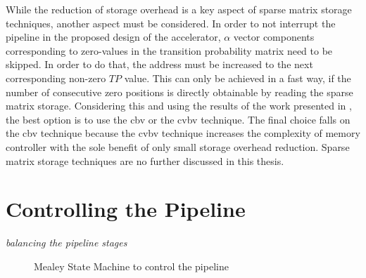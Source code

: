 \documentclass[mscthesis]{usiinfthesis}
\begin{document}
While the reduction of storage overhead is a key aspect of sparse matrix
storage techniques, another aspect must be considered. In order to not
interrupt the pipeline in the proposed design of the accelerator, $\alpha$
vector components corresponding to zero-values in the transition probability
matrix need to be skipped. In order to do that, the address must be increased
to the next corresponding non-zero $TP$ value. This can only be achieved in a
fast way, if the number of consecutive zero positions is directly obtainable
by reading the sparse matrix storage. Considering this and using the results of
the work presented in \cite{FCCM12_Kestur}, the best option is to use the
\gls{cbv} or the \gls{cvbv} technique. The final choice falls on the \gls{cbv}
technique because the \gls{cvbv} technique increases the complexity of memory
controller with the sole benefit of only small storage overhead reduction. 
Sparse matrix storage techniques are no further discussed in this thesis.

\section{Controlling the Pipeline}
\label{ch:design_ctrl}

\emph{\color{red}balancing the pipeline stages}

\begin{figure}
    \centering
    
    \caption{Mealey State Machine to control the pipeline}
    \label{fig:arch_sm}
\end{figure}

\end{document}
